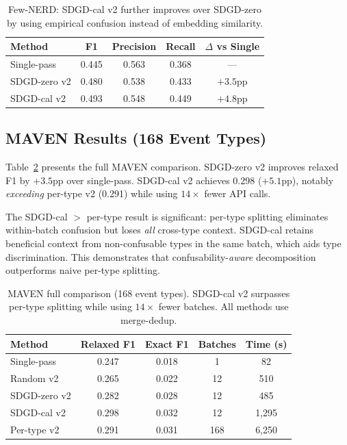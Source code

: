 \documentclass[11pt,a4paper]{article}
\begin{document}
\begin{table}[t]
\centering
\small
\begin{tabular}{lcccc}
\toprule
Method & F1 & Precision & Recall & $\Delta$ vs Single \\
\midrule
Single-pass    & 0.445 & 0.563 & 0.368 & --- \\
SDGD-zero v2   & 0.480 & 0.538 & 0.433 & $+3.5$pp \\
SDGD-cal v2    & 0.493 & 0.548 & 0.449 & $+4.8$pp \\
\bottomrule
\end{tabular}
\caption{Few-NERD: SDGD-cal v2 further improves over SDGD-zero by using empirical confusion instead of embedding similarity.}
\label{tab:fewnerd-cal}
\end{table}

\subsection{MAVEN Results (168 Event Types)}

Table~\ref{tab:maven-full} presents the full MAVEN comparison. SDGD-zero v2 improves relaxed F1 by $+3.5$pp over single-pass. SDGD-cal v2 achieves 0.298 ($+5.1$pp), notably \emph{exceeding} per-type v2 (0.291) while using $14\times$ fewer API calls.

The SDGD-cal $>$ per-type result is significant: per-type splitting eliminates within-batch confusion but loses \emph{all} cross-type context. SDGD-cal retains beneficial context from non-confusable types in the same batch, which aids type discrimination. This demonstrates that confusability-\emph{aware} decomposition outperforms naive per-type splitting.

\begin{table}[t]
\centering
\small
\begin{tabular}{lcccc}
\toprule
Method & Relaxed F1 & Exact F1 & Batches & Time (s) \\
\midrule
Single-pass    & 0.247 & 0.018 & 1   & 82 \\
Random v2      & 0.265 & 0.022 & 12  & 510 \\
SDGD-zero v2   & 0.282 & 0.028 & 12  & 485 \\
SDGD-cal v2    & 0.298 & 0.032 & 12  & 1,295 \\
Per-type v2    & 0.291 & 0.031 & 168 & 6,250 \\
\bottomrule
\end{tabular}
\caption{MAVEN full comparison (168 event types). SDGD-cal v2 surpasses per-type splitting while using $14\times$ fewer batches. All methods use merge-dedup.}
\label{tab:maven-full}
\end{table}
\end{document}
